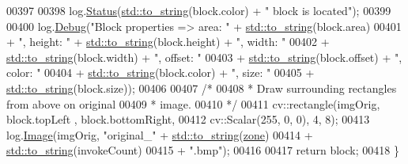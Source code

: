 \begin{DoxyCode}
00397 
00398         log.\hyperlink{classChipChipArray_1_1Log_a66575b6e94c6112e4cefa5736cb996e0}{Status}(\hyperlink{namespacestd_aa5ddf582a1c96ffe258c997be9a294a3}{std::to\_string}(block.color) + \textcolor{stringliteral}{" block is located"});
00399 
00400         log.\hyperlink{classChipChipArray_1_1Log_ac32b435af1577e4ebc67af2bdfea8eff}{Debug}(\textcolor{stringliteral}{"Block properties => area: "} + \hyperlink{namespacestd_aa5ddf582a1c96ffe258c997be9a294a3}{std::to\_string}(block.area)
00401                 + \textcolor{stringliteral}{", height: "} + \hyperlink{namespacestd_aa5ddf582a1c96ffe258c997be9a294a3}{std::to\_string}(block.height) + \textcolor{stringliteral}{", width: "}
00402                 + \hyperlink{namespacestd_aa5ddf582a1c96ffe258c997be9a294a3}{std::to\_string}(block.width) + \textcolor{stringliteral}{", offset: "}
00403                 + \hyperlink{namespacestd_aa5ddf582a1c96ffe258c997be9a294a3}{std::to\_string}(block.offset) + \textcolor{stringliteral}{", color: "}
00404                 + \hyperlink{namespacestd_aa5ddf582a1c96ffe258c997be9a294a3}{std::to\_string}(block.color) + \textcolor{stringliteral}{", size: "}
00405                 + \hyperlink{namespacestd_aa5ddf582a1c96ffe258c997be9a294a3}{std::to\_string}(block.size));
00406 
00407         \textcolor{comment}{/* }
00408 \textcolor{comment}{         * Draw surrounding rectangles from above on original}
00409 \textcolor{comment}{         * image.}
00410 \textcolor{comment}{         */}
00411         cv::rectangle(imgOrig, block.topLeft , block.bottomRight,
00412                 cv::Scalar(255, 0, 0), 4, 8);
00413         log.\hyperlink{classChipChipArray_1_1Log_a65bbab057c8b1453f9e4efcfee7522c4}{Image}(imgOrig, \textcolor{stringliteral}{"original\_"} + \hyperlink{namespacestd_aa5ddf582a1c96ffe258c997be9a294a3}{std::to\_string}(\hyperlink{classChipChipArray_1_1Grabber_ab57efe6e0b6f369b19528285a278d967}{zone})
00414                 + \hyperlink{namespacestd_aa5ddf582a1c96ffe258c997be9a294a3}{std::to\_string}(invokeCount)
00415                 + \textcolor{stringliteral}{".bmp"});
00416 
00417         \textcolor{keywordflow}{return} block;
00418     \}
\end{DoxyCode}


